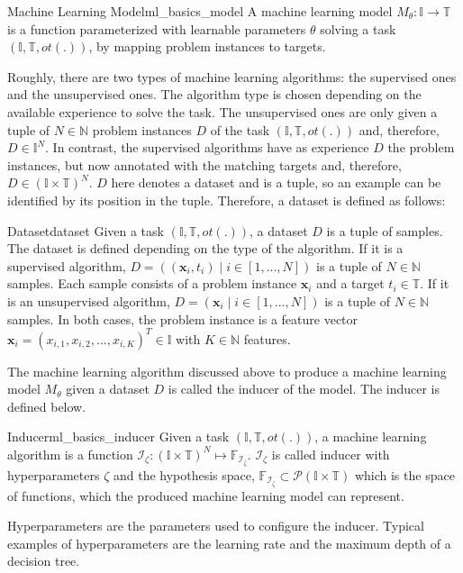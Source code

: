 \documentclass[../../../thesis]{subfiles}
\begin{document}
\begin{Def}{Machine Learning Model}{ml_basics_model}
A machine learning model $M_\theta: \mathbb{I} \to \mathbb{T}$ is a function parameterized with learnable parameters $\theta$ solving a task $(\mathbb{I}, \mathbb{T}, ot(.))$, by mapping problem instances to targets.
\end{Def}

Roughly, there are two types of machine learning algorithms: the supervised ones and the unsupervised ones. The algorithm type is chosen depending on the available experience to solve the task. The unsupervised ones are only given a tuple of $N \in \mathbb{N}$ problem instances $D$ of the task $(\mathbb{I}, \mathbb{T}, ot(.))$ and, therefore, $D \in \mathbb{I}^N$. In contrast, the supervised algorithms have as experience $D$ the problem instances, but now annotated with the matching targets and, therefore, $D \in (\mathbb{I} \times \mathbb{T})^N$. $D$ here denotes a dataset and is a tuple, so an example can be identified by its position in the tuple. Therefore, a dataset is defined as follows:

\begin{Def}{Dataset}{dataset}
Given a task $(\mathbb{I}, \mathbb{T}, ot(.))$, a dataset $D$ is a tuple of samples. The dataset is defined depending on the type of the algorithm.
If it is a supervised algorithm, $D = ((\mathbf{x}_i, t_i) \mid i \in [1,...,N])$ is a tuple of $N \in \mathbb{N}$ samples. Each sample consists of a problem instance $\mathbf{x}_i$ and a target $t_i \in \mathbb{T}$.
If it is an unsupervised algorithm, $D = (\mathbf{x}_i \mid i \in [1,...,N])$ is a tuple of $N \in \mathbb{N}$ samples.
In both cases, the problem instance is a feature vector $\mathbf{x}_i = (x_{i,1}, x_{i,2},...,x_{i,K})^T \in \mathbb{I}$ with $K \in \mathbb{N}$ features.
\end{Def}

The machine learning algorithm discussed above to produce a machine learning model $M_\theta$ given a dataset $D$ is called the inducer of the model. The inducer is defined below.

\begin{Def}{Inducer}{ml_basics_inducer}
Given a task $(\mathbb{I}, \mathbb{T}, ot(.))$, a machine learning algorithm is a function $\mathcal{I_\zeta}: (\mathbb{I} \times \mathbb{T})^N \mapsto \mathbb{F}_{\mathcal{I_\zeta}}$. $\mathcal{I_\zeta}$ is called inducer with hyperparameters $\zeta$ and the hypothesis space, $\mathbb{F}_{\mathcal{I_\zeta}} \subset \mathcal{P}(\mathbb{I} \times \mathbb{T})$ which is the space of functions, which the produced machine learning model can represent.
\end{Def}
Hyperparameters are the parameters used to configure the inducer. Typical examples of hyperparameters are the learning rate and the maximum depth of a decision tree.
\end{document}
